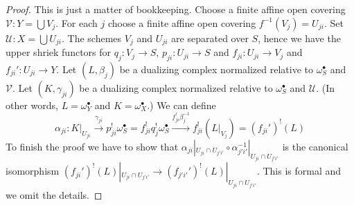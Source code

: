 \documentclass[10pt,a4paper]{amsart}
\theoremstyle{plain}
\theoremstyle{definition}
\theoremstyle{remark}
\numberwithin{equation}{subsection}
\begin{document}
\begin{proof}
This is just a matter of bookkeeping.
Choose a finite affine open covering $\mathcal{V} : Y = \bigcup V_j$.
For each $j$ choose a finite affine open covering $f^{-1}(V_j) = U_{ji}$.
Set $\mathcal{U} : X = \bigcup U_{ji}$. The schemes $V_j$ and $U_{ji}$ are
separated over $S$, hence we have the upper shriek functors for
$q_j : V_j \to S$, $p_{ji} : U_{ji} \to S$ and
$f_{ji} : U_{ji} \to V_j$ and $f_{ji}' : U_{ji} \to Y$.
Let $(L, \beta_j)$ be a dualizing complex normalized relative to
$\omega_S^\bullet$ and $\mathcal{V}$.
Let $(K, \gamma_{ji})$ be a dualizing complex normalized relative to
$\omega_S^\bullet$ and $\mathcal{U}$.
(In other words, $L = \omega_Y^\bullet$ and $K = \omega_X^\bullet$.)
We can define
$$
\alpha_{ji} :
K|_{U_{ji}} \xrightarrow{\gamma_{ji}}
p_{ji}^!\omega_S^\bullet = f_{ji}^!q_j^!\omega_S^\bullet
\xrightarrow{f_{ji}^!\beta_j^{-1}} f_{ji}^!(L|_{V_j}) =
(f_{ji}')^!(L)
$$
To finish the proof we have to show that
$\alpha_{ji}|_{U_{ji} \cap U_{j'i'}}
\circ \alpha_{j'i'}^{-1}|_{U_{ji} \cap U_{j'i'}}$
is the canonical isomorphism
$(f_{ji}')^!(L)|_{U_{ji} \cap U_{j'i'}} \to
(f_{j'i'}')^!(L)|_{U_{ji} \cap U_{j'i'}}$. This is formal and we
omit the details.
\end{proof}
\end{document}
